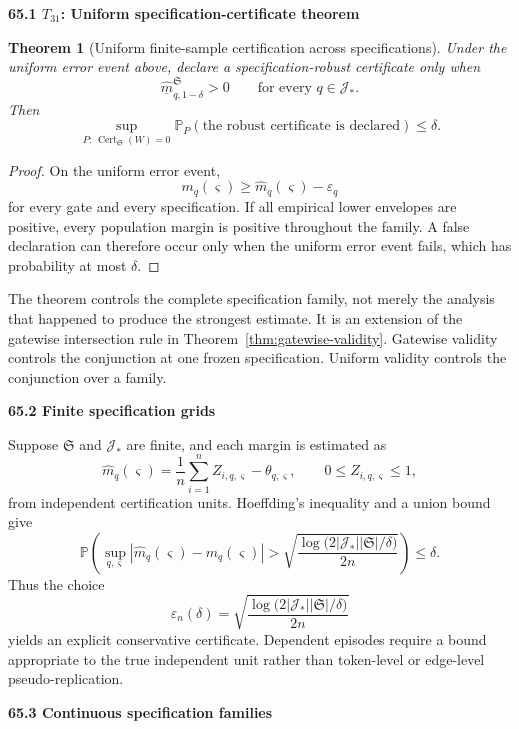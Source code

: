 \documentclass[11pt,letterpaper]{article}
\newcommand{\subtopic}[1]{%
 \vspace{0.45em}
 {\bfseries\color{AccentColor} #1\par}
}
\theoremstyle{plain}
\newtheorem{theorem}{Theorem}
\theoremstyle{definition}
\begin{document}
\subtopic{65.1 \(T_{31}\): Uniform specification-certificate theorem}

\begin{theorem}[Uniform finite-sample certification across specifications]
\label{thm:uniform-spec-certification}
Under the uniform error event above, declare a specification-robust certificate
only when
\[
\widehat{\underline m}_{q,1-\delta}^{\mathfrak S}>0
\qquad
\text{for every }q\in\mathcal J_*.
\]
Then
\[
\boxed{
\sup_{P:\,\operatorname{Cert}_{\mathfrak S}(W)=0}
\mathbb P_P
\left(
\text{the robust certificate is declared}
\right)
\leq\delta.
}
\]
\end{theorem}

\begin{proof}
On the uniform error event,
\[
m_q(\varsigma)
\geq
\widehat m_q(\varsigma)-\varepsilon_q
\]
for every gate and every specification. If all empirical lower envelopes are
positive, every population margin is positive throughout the family. A false
declaration can therefore occur only when the uniform error event fails, which
has probability at most \(\delta\).
\end{proof}

The theorem controls the complete specification family, not merely the
analysis that happened to produce the strongest estimate. It is an extension
of the gatewise intersection rule in Theorem~\ref{thm:gatewise-validity}.
Gatewise validity controls the conjunction at one frozen specification.
Uniform validity controls the conjunction over a family.

\subtopic{65.2 Finite specification grids}

Suppose \(\mathfrak S\) and \(\mathcal J_*\) are finite, and each margin is
estimated as
\[
\widehat m_q(\varsigma)
=
\frac1n\sum_{i=1}^nZ_{i,q,\varsigma}-\theta_{q,\varsigma},
\qquad
0\leq Z_{i,q,\varsigma}\leq1,
\]
from independent certification units. Hoeffding's inequality and a union bound
give
\[
\mathbb P\left(
\sup_{q,\varsigma}
\left|
\widehat m_q(\varsigma)-m_q(\varsigma)
\right|
>
\sqrt{
\frac{
\log\bigl(2|\mathcal J_*||\mathfrak S|/\delta\bigr)
}{2n}}
\right)
\leq\delta.
\]
Thus the choice
\[
\boxed{
\varepsilon_n(\delta)
=
\sqrt{
\frac{
\log\bigl(2|\mathcal J_*||\mathfrak S|/\delta\bigr)
}{2n}
}
}
\]
yields an explicit conservative certificate. Dependent episodes require a
bound appropriate to the true independent unit rather than token-level or
edge-level pseudo-replication.

\subtopic{65.3 Continuous specification families}
\end{document}
